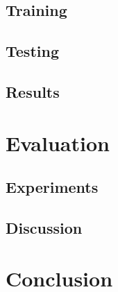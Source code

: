 \documentclass[
	ngerman,
	ruledheaders=section,%
	class=report,%
	thesis={type=bachelor},%
	accentcolor=9c,%
	custommargins=true,%
	marginpar=false,%
	parskip=half-,%
	fontsize=11pt,%
]{tudapub}
\begin{document}




\section{Training}

\section{Testing}

\section{Results}

\chapter{Evaluation}

\section{Experiments}

\section{Discussion}

\chapter{Conclusion}
\end{document}
